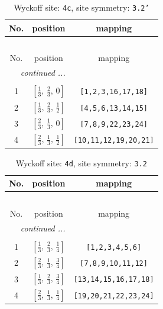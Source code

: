 \documentclass[fleqn,8pt]{jsarticle}
\begin{document}
\renewcommand{\arraystretch}{1.2}
\begin{longtable}{ccc}
\caption{Wyckoff site: {\tt 4c}, site symmetry: {\tt 3.2'}}
 \\
 \hline \hline
No. & position & mapping \\ \hline \endfirsthead

\multicolumn{2}{l}{\tablename\ \thetable{}} \\
 \hline \hline
No. & position & mapping \\ \hline \endhead

 \hline \hline
\multicolumn{2}{r}{\footnotesize\it continued ...} \\ \endfoot

 \hline \hline
\multicolumn{2}{r}{} \\ \endlastfoot

1 & $\left[ \frac{1}{3},\, \frac{2}{3},\, 0 \right]$ & {\tt [1,2,3,16,17,18]} \\ \hline
2 & $\left[ \frac{1}{3},\, \frac{2}{3},\, \frac{1}{2} \right]$ & {\tt [4,5,6,13,14,15]} \\ \hline
3 & $\left[ \frac{2}{3},\, \frac{1}{3},\, 0 \right]$ & {\tt [7,8,9,22,23,24]} \\ \hline
4 & $\left[ \frac{2}{3},\, \frac{1}{3},\, \frac{1}{2} \right]$ & {\tt [10,11,12,19,20,21]} \\
\end{longtable}
\renewcommand{\arraystretch}{1.2}
\begin{longtable}{ccc}
\caption{Wyckoff site: {\tt 4d}, site symmetry: {\tt 3.2}}
 \\
 \hline \hline
No. & position & mapping \\ \hline \endfirsthead

\multicolumn{2}{l}{\tablename\ \thetable{}} \\
 \hline \hline
No. & position & mapping \\ \hline \endhead

 \hline \hline
\multicolumn{2}{r}{\footnotesize\it continued ...} \\ \endfoot

 \hline \hline
\multicolumn{2}{r}{} \\ \endlastfoot

1 & $\left[ \frac{1}{3},\, \frac{2}{3},\, \frac{1}{4} \right]$ & {\tt [1,2,3,4,5,6]} \\ \hline
2 & $\left[ \frac{2}{3},\, \frac{1}{3},\, \frac{3}{4} \right]$ & {\tt [7,8,9,10,11,12]} \\ \hline
3 & $\left[ \frac{1}{3},\, \frac{2}{3},\, \frac{3}{4} \right]$ & {\tt [13,14,15,16,17,18]} \\ \hline
4 & $\left[ \frac{2}{3},\, \frac{1}{3},\, \frac{1}{4} \right]$ & {\tt [19,20,21,22,23,24]} \\
\end{longtable}
\end{document}
